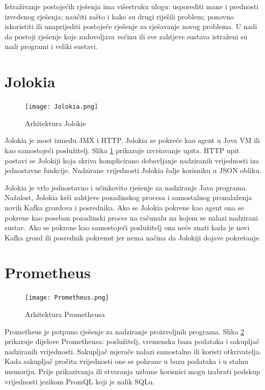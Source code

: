 \documentclass[utf8, diplomski, lmodern, numeric]{fer}
\begin{document}
Istraživanje postojećih rješenja ima višestruku ulogu: usporediti mane i prednosti izvedenog rješenja; naučiti zašto i kako su drugi riješili problem; ponovno iskoristiti ili unaprijediti postojeće rješenje za rješavanje novog problema. U nadi da postoji rješenje koje zadovoljava većinu ili sve zahtjeve sustava istraženi su mali programi i veliki sustavi.


\section{Jolokia}

\begin{figure}[H]
    \centering
    \texttt{[image: Jolokia.png]}
    \caption{Arhitektura Jolokie}
    \label{fig:jolokia}
\end{figure}

Jolokia \citep{jolokia} je most između JMX i HTTP. Jolokia se pokreće kao agent u Java VM ili kao samostojeći poslužitelj. Slika \ref{fig:jolokia} prikazuje izvršavanje upita. HTTP upit postavi se Jolokiji koja skriva komplicirano dobavljanje nadziranih vrijednosti iza jednostavne funkcije. Nadzirane vrijednosti Jolokia šalje korisniku u JSON obliku.

Jolokia je vrlo jednostavno i učinkovito rješenje za nadziranje Java programa. Nažalost, Jolokia krši zahtjeve pozadinskog procesa i samostalnog pronalaženja novih Kafka grozdova i posrednika. Ako se Jolokia pokrene kao agent ona se pokrene kao poseban pozadinski proces na računalu na kojem se nalazi nadzirani sustav. Ako se pokrene kao samostojeći poslužitelj ona neće znati kada je novi Kafka grozd ili posrednik pokrenut jer nema načina da Jolokiji dojave pokretanje.


\section{Prometheus}

\begin{figure}[H]
    \centering
    \texttt{[image: Prometheus.png]}
    \caption{Arhitektura Prometheusa}
    \label{fig:prometheus}
\end{figure}

Prometheus \citep{prometheus} je potpuno rješenje za nadziranje proizvoljnih programa. Slika \ref{fig:prometheus} prikazuje dijelove Prometheusa: poslužitelj, vremenska baza podataka i sakupljač nadziranih vrijednosti. Sakupljač mjerače nalazi samostalno ili koristi otkrivatelja. Kada sakupljač pročita vrijednosti one se pohrane u bazu podataka i u stalnu memoriju. Prije prikazivanja ili stvaranja uzbune korisnici mogu izabrati podskup vrijednosti jezikom PromQL koji je nalik SQLu.
\end{document}

